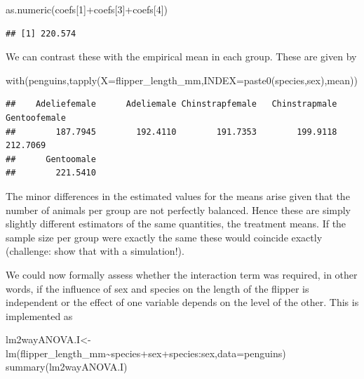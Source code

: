 \documentclass[
]{book}
\newenvironment{Shaded}{\begin{snugshade}}{\end{snugshade}}
\newcommand{\AttributeTok}[1]{\textcolor[rgb]{0.77,0.63,0.00}{#1}}
\newcommand{\DecValTok}[1]{\textcolor[rgb]{0.00,0.00,0.81}{#1}}
\newcommand{\FunctionTok}[1]{\textcolor[rgb]{0.00,0.00,0.00}{#1}}
\newcommand{\NormalTok}[1]{#1}
\newcommand{\OtherTok}[1]{\textcolor[rgb]{0.56,0.35,0.01}{#1}}
\newcommand{\SpecialCharTok}[1]{\textcolor[rgb]{0.00,0.00,0.00}{#1}}
\begin{document}
\begin{Shaded}
\begin{Highlighting}[]
\FunctionTok{as.numeric}\NormalTok{(coefs[}\DecValTok{1}\NormalTok{]}\SpecialCharTok{+}\NormalTok{coefs[}\DecValTok{3}\NormalTok{]}\SpecialCharTok{+}\NormalTok{coefs[}\DecValTok{4}\NormalTok{])}
\end{Highlighting}
\end{Shaded}

\begin{verbatim}
## [1] 220.574
\end{verbatim}

We can contrast these with the empirical mean in each group. These are given by

\begin{Shaded}
\begin{Highlighting}[]
\FunctionTok{with}\NormalTok{(penguins,}\FunctionTok{tapply}\NormalTok{(}\AttributeTok{X=}\NormalTok{flipper\_length\_mm,}\AttributeTok{INDEX=}\FunctionTok{paste0}\NormalTok{(species,sex),mean))}
\end{Highlighting}
\end{Shaded}

\begin{verbatim}
##    Adeliefemale      Adeliemale Chinstrapfemale   Chinstrapmale    Gentoofemale 
##        187.7945        192.4110        191.7353        199.9118        212.7069 
##      Gentoomale 
##        221.5410
\end{verbatim}

The minor differences in the estimated values for the means arise given that the number of animals per group are not perfectly balanced. Hence these are simply slightly different estimators of the same quantities, the treatment means. If the sample size per group were exactly the same these would coincide exactly (challenge: show that with a simulation!).

We could now formally assess whether the interaction term was required, in other words, if the influence of sex and species on the length of the flipper is independent or the effect of one variable depends on the level of the other. This is implemented as

\begin{Shaded}
\begin{Highlighting}[]
\NormalTok{lm2wayANOVA.I}\OtherTok{\textless{}{-}}\FunctionTok{lm}\NormalTok{(flipper\_length\_mm}\SpecialCharTok{\textasciitilde{}}\NormalTok{species}\SpecialCharTok{+}\NormalTok{sex}\SpecialCharTok{+}\NormalTok{species}\SpecialCharTok{:}\NormalTok{sex,}\AttributeTok{data=}\NormalTok{penguins)}
\FunctionTok{summary}\NormalTok{(lm2wayANOVA.I)}
\end{Highlighting}
\end{Shaded}
\end{document}
